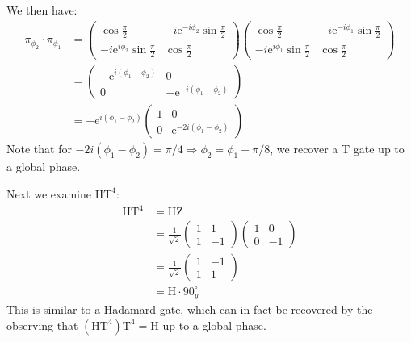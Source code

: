 \begin{parts}
	We then have:
	\begin{align*}
		\pi_{\phi_2} \cdot \pi_{\phi_1} &= \begin{pmatrix}
			\cos\frac{\pi}{2} & -i\mathrm{e}^{-i\phi_2} \sin\frac{\pi}{2} \\
			-i\mathrm{e}^{i\phi_2} \sin\frac{\pi}{2} & \cos\frac{\pi}{2}
		\end{pmatrix}
		\begin{pmatrix}
			\cos\frac{\pi}{2} & -i\mathrm{e}^{-i\phi_1} \sin\frac{\pi}{2} \\
			-i\mathrm{e}^{i\phi_1} \sin\frac{\pi}{2} & \cos\frac{\pi}{2}
		\end{pmatrix} \\
		&= \begin{pmatrix}
			-\mathrm{e}^{i(\phi_1 - \phi_2)} & 0 \\
			0 & -\mathrm{e}^{-i(\phi_1 - \phi_2)}
		\end{pmatrix} \\
		&= -\mathrm{e}^{i(\phi_1 - \phi_2)} \begin{pmatrix}
			1 & 0 \\
			0 & \mathrm{e}^{-2i(\phi_1 - \phi_2)}
		\end{pmatrix}
	\end{align*}
	Note that for $-2i(\phi_1 - \phi_2) = \pi/4 \Rightarrow \phi_2 = \phi_1 + \pi/8$, we recover a $\mathrm{T}$ gate up to a global phase.
	
	Next we examine $\mathrm{H}\mathrm{T}^4$:
	\begin{align*}
		\mathrm{H}\mathrm{T}^4 &= \mathrm{H}\mathrm{Z} \\
		&= \frac{1}{\sqrt{2}} \begin{pmatrix}
			1 & 1 \\
			1 & -1
		\end{pmatrix}
		\begin{pmatrix}
			1 & 0 \\
			0 & -1
		\end{pmatrix} \\
		&= \frac{1}{\sqrt{2}} \begin{pmatrix}
			1 & -1 \\
			1 & 1
		\end{pmatrix} \\
		&= \mathrm{H} \cdot 90^\circ_y
	\end{align*}
	This is similar to a Hadamard gate, which can in fact be recovered by the observing that $(\mathrm{H}\mathrm{T}^4)\mathrm{T}^4 = \mathrm{H}$ up to a global phase.
	

\end{parts}
